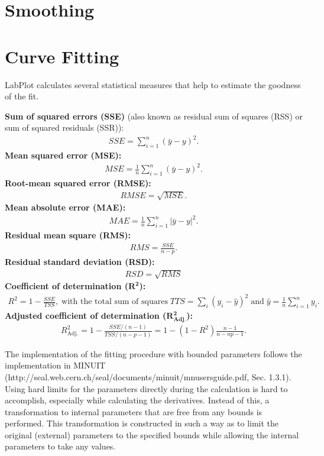 \section{Smoothing}\label{sec:smoothing}
\section{Curve Fitting}\label{sec:curve_fitting}
LabPlot calculates several statistical measures that help to estimate the goodness of the fit.

\textbf{Sum of squared errors (SSE)} (also known as residual sum of squares (RSS) or sum of squared residuals (SSR)):
\begin{eqnarray*}
SSE = \sum_{i=1}^n (\bar y -y)^2.
\end{eqnarray*}
\textbf{Mean squared error (MSE):}
\begin{eqnarray*}
MSE = \frac{1}{n} \sum_{i=1}^n (\bar y -y)^2.
\end{eqnarray*}
\textbf{Root-mean squared error (RMSE):}
\begin{eqnarray*}
RMSE = \sqrt{MSE}.
\end{eqnarray*}
\textbf{Mean absolute error (MAE):}
\begin{eqnarray*}
MAE = \frac{1}{n} \sum_{i=1}^n |\bar y -y|^2.
\end{eqnarray*}
\textbf{Residual mean square (RMS):}
\begin{eqnarray*}
RMS = \frac{SSE}{n-p}.
\end{eqnarray*}
\textbf{Residual standard deviation (RSD):}
\begin{eqnarray*}
RSD = \sqrt{RMS}
\end{eqnarray*}
\textbf{Coefficient of determination ($\mathbf{R^2}$):}
\begin{eqnarray*}
R^2 = 1 - \frac{SSE}{TSS},\; \text{with the total sum of squares}\; TTS = \sum_i (y_i - \hat y)^2\; \text{and}\; \hat y = \frac 1n \sum_{i=1}^n y_i.
\end{eqnarray*}
\textbf{Adjusted coefficient of determination (}$\mathbf{R^2_{Adj.}}$\textbf{):}
\begin{eqnarray*}
R^2_{\mathrm{Adj.}} = 1 - \frac{SSE/(n-1)}{TSS/(n-p-1)} =  1 - (1-R^2) \frac{n-1}{n-np-1}.
\end{eqnarray*}


The implementation of the fitting procedure with bounded parameters follows the implementation in MINUIT (http://seal.web.cern.ch/seal/documents/minuit/mnusersguide.pdf, Sec. 1.3.1). Using hard limits for the parameters directly during the calculation is hard to accomplish, especially while calculating the derivatives. Instead of this, a transformation to internal parameters that are free from any bounds is performed. This transformation is constructed in such a way as to limit the original (external) parameters to the specified bounds while allowing the internal parameters to take any values.

